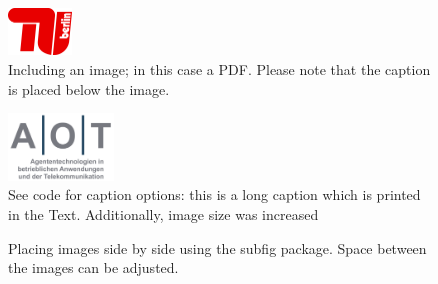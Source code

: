\begin{figure}[h]%
\centering
\includegraphics[width=0.15\textwidth]{template/TUBerlin_Logo_rot_hell}
\caption[Including an Image]{Including an image; in this case a PDF. Please note that the caption is placed below the image.\label{fig:help1}}
\end{figure}

\begin{figure}[h]
\centering
\includegraphics[width=0.25\textwidth]{template/aot_logo}
\caption[Short caption for list of figures]{See code for caption options: this is a long caption which is printed in the Text. Additionally, image size was increased\label{fig:help2}}
\end{figure}


\begin{figure}[h]
  \centering
  \caption[Placing images side by side]{Placing images side by side using the subfig package. Space between the images can be adjusted.\label{fig:tuball}}
\end{figure}


